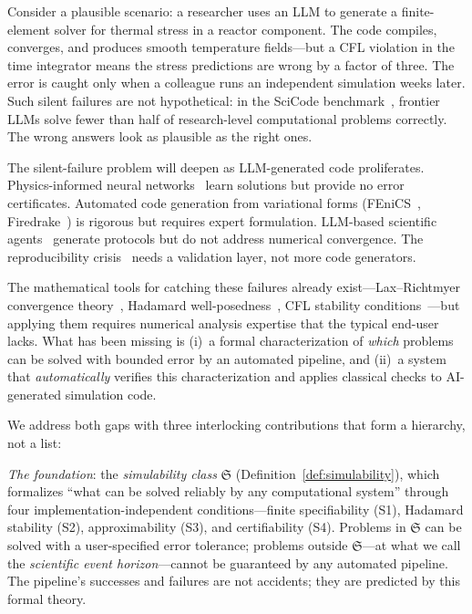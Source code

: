 \documentclass[11pt,a4paper]{article}
\newcommand{\Sclass}{\mathfrak{S}}
\begin{document}

Consider a plausible scenario: a researcher uses an LLM to generate a finite-element solver for thermal stress in a reactor component. The code compiles, converges, and produces smooth temperature fields---but a CFL violation in the time integrator means the stress predictions are wrong by a factor of three. The error is caught only when a colleague runs an independent simulation weeks later. Such silent failures are not hypothetical: in the SciCode benchmark~\cite{tian2024scicode}, frontier LLMs solve fewer than half of research-level computational problems correctly. The wrong answers look as plausible as the right ones.

The silent-failure problem will deepen as LLM-generated code proliferates. Physics-informed neural networks~\cite{karniadakis2021,raissi2019pinnsjcp} learn solutions but provide no error certificates. Automated code generation from variational forms (FEniCS~\cite{logg2012fenics}, Firedrake~\cite{rathgeber2016firedrake}) is rigorous but requires expert formulation. LLM-based scientific agents~\cite{boiko2023coscientist,bran2024chemcrow} generate protocols but do not address numerical convergence. The reproducibility crisis~\cite{baker2016,peng2011} needs a validation layer, not more code generators.

The mathematical tools for catching these failures already exist---Lax--Richtmyer convergence theory~\cite{lax1956}, Hadamard well-posedness~\cite{hadamard1902}, CFL stability conditions~\cite{courant1928}---but applying them requires numerical analysis expertise that the typical end-user lacks. What has been missing is (i)~a formal characterization of \emph{which} problems can be solved with bounded error by an automated pipeline, and (ii)~a system that \emph{automatically} verifies this characterization and applies classical checks to AI-generated simulation code.

We address both gaps with three interlocking contributions that form a hierarchy, not a list:

\emph{The foundation}: the \emph{simulability class} $\Sclass$ (Definition~\ref{def:simulability}), which formalizes ``what can be solved reliably by any computational system'' through four implementation-independent conditions---finite specifiability (S1), Hadamard stability (S2), approximability (S3), and certifiability (S4). Problems in $\Sclass$ can be solved with a user-specified error tolerance; problems outside $\Sclass$---at what we call the \emph{scientific event horizon}---cannot be guaranteed by any automated pipeline. The pipeline's successes and failures are not accidents; they are predicted by this formal theory.
\end{document}
